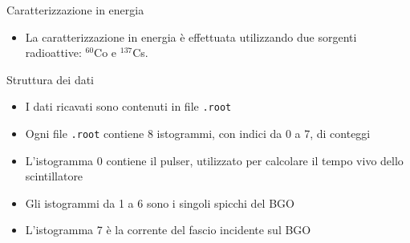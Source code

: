\documentclass [xcolor=svgnames] {beamer}
\begin{document}
\begin{frame}{Caratterizzazione in energia}
	\begin{itemize}
			\item La caratterizzazione in energia è effettuata utilizzando due sorgenti radioattive: $^{60}$Co e $^{137}$Cs.
		\end{itemize}
\end{frame}



\begin{frame}{Struttura dei dati}
	\begin{itemize}
			\item I dati ricavati sono contenuti in file \texttt{.root}
			\item Ogni file \texttt{.root} contiene 8 istogrammi, con indici da 0 a 7, di conteggi
			\item L'istogramma 0 contiene il pulser, utilizzato per calcolare il tempo vivo dello scintillatore
			\item Gli istogrammi da 1 a 6 sono i singoli spicchi del BGO
			\item L'istogramma 7 è la corrente del fascio incidente sul BGO
		\end{itemize}
\end{frame}
\end{document}
